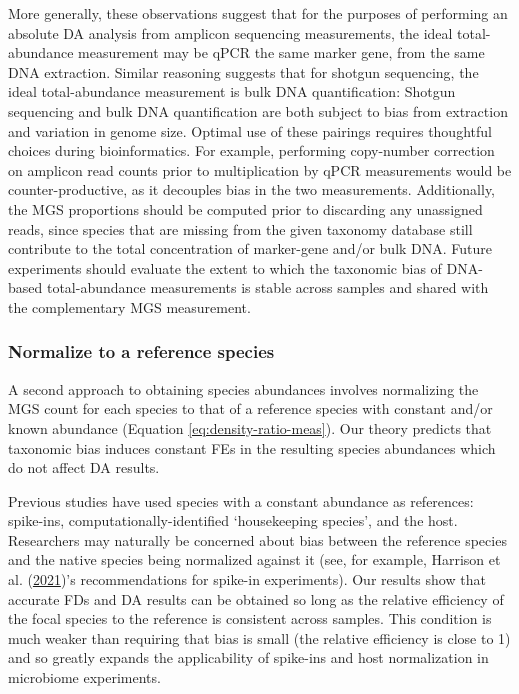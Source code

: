 \documentclass[
]{article}
\begin{document}
More generally, these observations suggest that for the purposes of performing an absolute DA analysis from amplicon sequencing measurements, the ideal total-abundance measurement may be qPCR the same marker gene, from the same DNA extraction.
Similar reasoning suggests that for shotgun sequencing, the ideal total-abundance measurement is bulk DNA quantification: Shotgun sequencing and bulk DNA quantification are both subject to bias from extraction and variation in genome size.
Optimal use of these pairings requires thoughtful choices during bioinformatics. For example, performing copy-number correction on amplicon read counts prior to multiplication by qPCR measurements would be counter-productive, as it decouples bias in the two measurements. Additionally, the MGS proportions should be computed prior to discarding any unassigned reads, since species that are missing from the given taxonomy database still contribute to the total concentration of marker-gene and/or bulk DNA.
Future experiments should evaluate the extent to which the taxonomic bias of DNA-based total-abundance measurements is stable across samples and shared with the complementary MGS measurement.

\hypertarget{normalize-to-a-reference-species}{%
\subsubsection{Normalize to a reference species}\label{normalize-to-a-reference-species}}

A second approach to obtaining species abundances involves normalizing the MGS count for each species to that of a reference species with constant and/or known abundance (Equation \eqref{eq:density-ratio-meas}).
Our theory predicts that taxonomic bias induces constant FEs in the resulting species abundances which do not affect DA results.

Previous studies have used species with a constant abundance as references: spike-ins, computationally-identified `housekeeping species', and the host.
Researchers may naturally be concerned about bias between the reference species and the native species being normalized against it (see, for example, Harrison et al. (\protect\hyperlink{ref-harrison2021theq}{2021})'s recommendations for spike-in experiments).
Our results show that accurate FDs and DA results can be obtained so long as the relative efficiency of the focal species to the reference is consistent across samples.
This condition is much weaker than requiring that bias is small (the relative efficiency is close to 1) and so greatly expands the applicability of spike-ins and host normalization in microbiome experiments.
\end{document}
